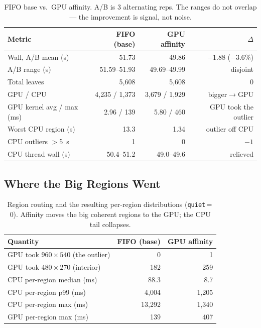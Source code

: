 \documentclass[
	english,
	letterpaper, oneside
]{article}
\begin{document}
\begin{table}[H]
    \centering
    \caption{FIFO base vs.\ GPU affinity. A/B is 3 alternating reps. The ranges
             do not overlap --- the improvement is signal, not noise.}
    \label{tab:aff}
    \begin{tabular}{lrrr}
        \hline
        Metric & FIFO (base) & GPU affinity & $\Delta$ \\
        \hline
        Wall, A/B mean (s)        & 51.73 & 49.86 & $-1.88$ ($-3.6\%$) \\
        \quad A/B range (s)       & 51.59--51.93 & 49.69--49.99 & disjoint \\
        Total leaves              & 5{,}608 & 5{,}608 & 0 \\
        \quad GPU / CPU           & 4{,}235 / 1{,}373 & 3{,}679 / 1{,}929 & bigger$\to$GPU \\
        GPU kernel avg / max (ms) & 2.96 / 139 & 5.80 / 460 & GPU took the outlier \\
        Worst CPU region (s)      & 13.3 & 1.34 & outlier off CPU \\
        CPU outliers $>$5~s       & 1 & 0 & $-1$ \\
        CPU thread wall (s)       & 50.4--51.2 & 49.0--49.6 & relieved \\
        \hline
    \end{tabular}
\end{table}

\subsection{Where the Big Regions Went}

\begin{table}[H]
    \centering
    \caption{Region routing and the resulting per-region distributions
             (\texttt{quiet}\,=\,0). Affinity moves the big coherent regions to
             the GPU; the CPU tail collapses.}
    \label{tab:aff-route}
    \begin{tabular}{lrr}
        \hline
        Quantity & FIFO (base) & GPU affinity \\
        \hline
        GPU took $960\times540$ (the outlier) & 0 & 1 \\
        GPU took $480\times270$ (interior)    & 182 & 259 \\
        \hline
        CPU per-region median (ms) & 88.3 & 8.7 \\
        CPU per-region p99 (ms)    & 4{,}004 & 1{,}205 \\
        CPU per-region max (ms)    & 13{,}292 & 1{,}340 \\
        GPU per-region max (ms)    & 139 & 407 \\
        \hline
    \end{tabular}
\end{table}
\end{document}
